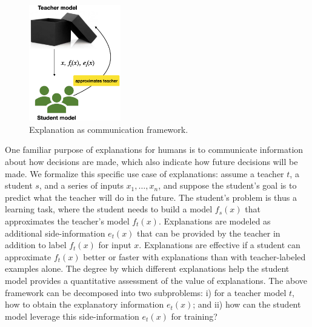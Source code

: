 \documentclass{article}
\begin{document}
\begin{figure}
    \includegraphics[width=4cm]{explanation-as-communication}
    \caption{Explanation as communication framework.}\label{fig:communication}
\end{figure} 
One familiar purpose of explanations for 
humans is to communicate information about 
how decisions are made, 
which also indicate how future decisions will be made.  
We formalize this specific 
use case of explanations:
assume a teacher $t$, a student $s$, and a series of inputs $x_1, \dots, x_n$, and 
suppose the student’s goal is to predict what the teacher will do in the future.
The student’s problem is thus a learning task, where the student needs to build a model $f_s(x)$ 
that approximates the teacher’s model $f_t(x)$.  
Explanations are modeled as 
additional side-information $e_t(x)$ that can be provided by the teacher in addition to label $f_t(x)$ for input $x$. 
Explanations are effective 
if a student can approximate $f_t(x)$ better or faster 
with explanations than with teacher-labeled examples alone. 
The degree by which different explanations 
help the student model 
provides a quantitative assessment 
of the value of explanations.
The above framework can be decomposed into two subproblems: 
i) for a teacher model $t$, how to obtain the explanatory information $e_t(x)$; and 
ii) how can the student model leverage this side-information $e_t(x)$ for training?
\end{document}
